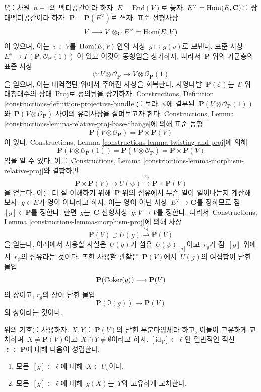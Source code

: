 \noindent
$V$를 차원\  $n + 1$의 벡터공간이라 하자. $E = \text{End}(V)$로 놓자.
$E^\vee = \mathop{\mathrm{Hom}}\nolimits(E, \mathbf{C})$를 쌍대벡터공간이라 하자.
$\mathbf{P} = \mathbf{P}(E^\vee)$로 쓰자.
표준 선형사상
$$
V \longrightarrow V \otimes_\mathbf{C} E^\vee = \mathop{\mathrm{Hom}}\nolimits(E, V)
$$
이 있으며, 이는\  $v \in V$를\  $\mathop{\mathrm{Hom}}\nolimits(E, V)$ 안의 사상\ 
$g \mapsto g(v)$로 보낸다. 표준 사상\ 
$E^\vee \to \Gamma(\mathbf{P}, \mathcal{O}_\mathbf{P}(1))$
이 있고 이것이 동형임을 상기하자. 따라서\  $\mathbf{P}$ 위의 가군층의
표준 사상
$$
\psi : V \otimes \mathcal{O}_\mathbf{P} \to V \otimes \mathcal{O}_\mathbf{P}(1)
$$
을 얻으며, 이는 대역절단 위에서 주어진 사상을 회복한다. 사영다발\ 
$\mathbf{P}(\mathcal{E})$는\  $\mathcal{E}$ 위 대칭대수의 상대\  Proj로
정의됨을 상기하자. Constructions, Definition
\ref{constructions-definition-projective-bundle}를 보라.
$\psi$에 결부된\  $\mathbf{P}(V \otimes \mathcal{O}_\mathbf{P}(1))$와\ 
$\mathbf{P}(V \otimes \mathcal{O}_\mathbf{P})$ 사이의 유리사상을
살펴보고자 한다. Constructions, Lemma
\ref{constructions-lemma-relative-proj-base-change}에 의해 표준 동형
$$
\mathbf{P}(V \otimes \mathcal{O}_\mathbf{P}) = \mathbf{P} \times \mathbf{P}(V)
$$
이 있다. Constructions, Lemma
\ref{constructions-lemma-twisting-and-proj}에 의해
$$
\mathbf{P}(V \otimes \mathcal{O}_\mathbf{P}(1)) =
\mathbf{P}(V \otimes \mathcal{O}_\mathbf{P}) = \mathbf{P} \times \mathbf{P}(V)
$$
임을 알 수 있다. 이를\  Constructions, Lemma
\ref{constructions-lemma-morphism-relative-proj}와 결합하면
\begin{equation}
\label{equation-r-psi}
\mathbf{P} \times \mathbf{P}(V) \supset
U(\psi) \xrightarrow{r_\psi} \mathbf{P} \times \mathbf{P}(V)
\end{equation}
을 얻는다. 이를 더 잘 이해하기 위해\  $\mathbf{P}$ 위의 섬유에서
무슨 일이 일어나는지 계산해 보자. $g \in E$가 영이 아니라고 하자.
이는 영이 아닌 사상\  $E^\vee \to \mathbf{C}$를 정하므로 점\ 
$[g] \in \mathbf{P}$를 정한다. 한편\  $g$는\  $\mathbf{C}$-선형사상\ 
$g : V \to V$를 정한다. 따라서\  Constructions, Lemma
\ref{constructions-lemma-morphism-proj}에 의해 사상
$$
\mathbf{P}(V) \supset U(g) \xrightarrow{r_g} \mathbf{P}(V)
$$
을 얻는다. 아래에서 사용할 사실은\  $U(g)$가 섬유\  $U(\psi)_{[g]}$이고\ 
$r_g$가 점\  $[g]$ 위에서\  $r_\psi$의 섬유라는 것이다. 또한 사용할
관찰은\  $\mathbf{P}(V)$에서\  $U(g)$의 여집합이 닫힌 몰입
$$
\mathbf{P}(\mathop{\mathrm{Coker}}(g)) \longrightarrow \mathbf{P}(V)
$$
의 상이고, $r_g$의 상이 닫힌 몰입
$$
\mathbf{P}(\Im(g)) \longrightarrow \mathbf{P}(V)
$$
의 상이라는 것이다.

\begin{lemma}
\label{lemma-make-family}
위의 기호를 사용하자. $X, Y$를\  $\mathbf{P}(V)$의 닫힌 부분다양체라
하고, 이들이 고유하게 교차하며\  $X \not = \mathbf{P}(V)$이고\ 
$X \cap Y \not = \emptyset$이라고 하자. $[\text{id}_V] \in \ell$인
일반적인 직선\  $\ell \subset \mathbf{P}$에 대해 다음이 성립한다.
\begin{enumerate}
\item 모든\  $[g] \in \ell$에 대해\  $X \subset U_g$이다.
\item 모든\  $[g] \in \ell$에 대해\  $g(X)$는\  $Y$와 고유하게 교차한다.
\end{enumerate}
\end{lemma}

